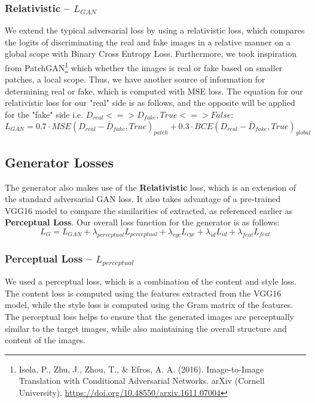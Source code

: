 \documentclass[twoside,english,notitlepage]{report}
\begin{document}
\subsubsection{Relativistic – $L_{GAN}$}
We extend the typical adversarial loss by using a relativistic loss, which compares the logits of discriminating the real and fake images in a relative manner on a global scope with Binary Cross Entropy Loss. Furthermore, we took inspiration from PatchGAN\footnote{Isola, P., Zhu, J., Zhou, T., \& Efros, A. A. (2016). Image-to-Image Translation with Conditional Adversarial Networks. arXiv (Cornell University). \href{https://doi.org/10.48550/arxiv.1611.07004}{https://doi.org/10.48550/arxiv.1611.07004}} which whether the images is real or fake based on smaller patches, a local scope. Thus, we have another source of information for determining real or fake, which is computed with MSE loss. The equation for our relativistic loss for our "real" side is as follows, and the opposite will be applied for the "fake" side i.e. $D_{real} <=> D_{fake}, True <=> False$:
\begin{equation}
    L_{GAN} = 0.7 \cdot MSE(D_{real} - \bar{D}_{fake}, True)_{patch} + 0.3 \cdot BCE(D_{real} - \bar{D}_{fake}, True)_{global}
\end{equation}

\subsection{Generator Losses}
The generator also makes use of the \textbf{Relativistic} loss, which is an extension of the standard adversarial GAN loss. It also takes advantage of a pre-trained VGG16 model to compare the similarities of extracted, as referenced earlier as \textbf{Perceptual Loss}. Our overall loss function for the generator is as follows:
\begin{equation}
    L_{G} = L_{GAN} + \lambda_{perceptual} L_{perceptual} + \lambda_{cyc} L_{cyc} + \lambda_{id} L_{id} + \lambda_{feat} L_{feat}
\end{equation}

\subsubsection{Perceptual Loss – $L_{perceptual}$}\label{task2:generator:loss:perceptual}
We used a perceptual loss, which is a combination of the content and style loss. The content loss is computed using the features extracted from the VGG16 model, while the style loss is computed using the Gram matrix of the features. The perceptual loss helps to ensure that the generated images are perceptually similar to the target images, while also maintaining the overall structure and content of the images.
\end{document}
